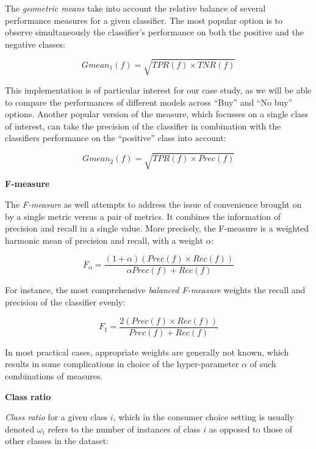 \documentclass[11pt,]{article}
\begin{document}
The \emph{geometric means} take into account the relative balance of
several performance measures for a given classifier. The most popular
option is to observe simultaneously the classifier's performance on both
the positive and the negative classes:

\begin{equation}
Gmean_1 (f) = \sqrt{TPR (f) \times TNR (f)}
\end{equation}

This implementation is of particular interest for our case study, as we
will be able to compare the performances of different models across
``Buy'' and ``No buy'' options. Another popular version of the measure,
which focusses on a single class of interest, can take the precision of
the classifier in combination with the classifiers performance on the
``positive'' class into account:

\begin{equation}
Gmean_2 (f) = \sqrt{TPR (f) \times Prec (f)}
\end{equation}

\textbf{F-measure}

The \emph{F-measure} as well attempts to address the issue of
convenience brought on by a single metric versus a pair of metrics. It
combines the information of precision and recall in a single value. More
precisely, the F-measure is a weighted harmonic mean of precision and
recall, with a weight \(\alpha\):

\begin{equation}
F_{\alpha} = \frac
  {(1 + \alpha)(Prec (f) \times Rec (f))}
  {\alpha Prec (f) + Rec (f)}
\end{equation}

For instance, the most comprehensive \emph{balanced F-measure} weights
the recall and precision of the classifier evenly:

\begin{equation}
F_{1} = \frac
  {2(Prec (f) \times Rec (f))}
  {Prec (f) + Rec (f)}
\end{equation}

In most practical cases, appropriate weights are generally not known,
which results in some complications in choice of the hyper-parameter
\(\alpha\) of such combinations of measures.

\textbf{Class ratio}

\emph{Class ratio} for a given class \(i\), which in the consumer choice
setting is usually denoted \(\omega_i\) refers to the number of
instances of class \(i\) as opposed to those of other classes in the
dataset:
\end{document}
